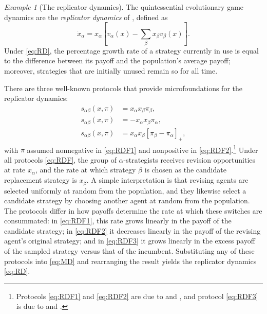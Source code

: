 \documentclass[reqno]{amsart}
\theoremstyle{plain}
\theoremstyle{definition}
\theoremstyle{remark}
\newtheorem{example}[theorem]{Example}
\numberwithin{equation}{section}
\numberwithin{theorem}{section}
\begin{document}
\begin{example}
[The replicator dynamics]
\label{ex:Rep}
The quintessential evolutionary game dynamics are the \emph{replicator dynamics} of \cite{TJ78}, defined as
\begin{equation}
\label{eq:RD}
\tag{RD}
\dot x_{\alpha}
	= x_{\alpha} \left[ {v}_{\alpha}(x) - {\sum\nolimits}_{\beta} x_{\beta} {v}_{\beta}(x) \right].
\end{equation}
Under \eqref{eq:RD}, the percentage growth rate of a strategy currently in use is equal to the difference between its payoff and the population's average payoff;
moreover, strategies that are initially unused remain so for all time.

There are three well-known protocols that provide microfoundations for the replicator dynamics:
\begin{subequations}
\label{eq:RDF}
\begin{align}
\label{eq:RDF1}
{s}_{\alpha\beta}(x,\pi)
	&=x_{\alpha} x_{\beta} \pi_{\beta},
	\\
\label{eq:RDF2}
{s}_{\alpha\beta}(x,\pi)
	&=-x_{\alpha} x_{\beta} \pi_{\alpha},
	\\
\label{eq:RDF3}
{s}_{\alpha\beta}(x,\pi)
	&=x_{\alpha} x_{\beta} \left[ \pi_{\beta} -\pi_{\alpha} \right]_{+},
\end{align}
\end{subequations}
with $\pi$ assumed nonnegative in \eqref{eq:RDF1} and nonpositive in \eqref{eq:RDF2}.\footnote{Protocols \eqref{eq:RDF1} and \eqref{eq:RDF2} are due to \cite{BW96} and \cite{Wei95}, and protocol \eqref{eq:RDF3} is due to \cite{Hel92} and \cite{Sch98}.}
Under all protocols \eqref{eq:RDF}, the group of $\alpha$-strategists receives revision opportunities at rate $x_{\alpha}$, and the rate at which strategy $\beta$ is chosen as the candidate replacement strategy is $x_{\beta}$.
A simple interpretation is that revising agents are selected uniformly at random from the population, and they likewise select a candidate strategy by choosing another agent at random from the population.
The protocols differ in how payoffs determine the rate at which these switches are consummated:
in \eqref{eq:RDF1}, this rate grows linearly in the payoff of the candidate strategy;
in \eqref{eq:RDF2} it decreases linearly in the payoff of the revising agent's original strategy;
and in \eqref{eq:RDF3} it grows linearly in the excess payoff of the sampled strategy versus that of the incumbent.
Substituting any of these protocols into \eqref{eq:MD} and rearranging the result yields the replicator dynamics \eqref{eq:RD}. 
\end{example}
\end{document}
